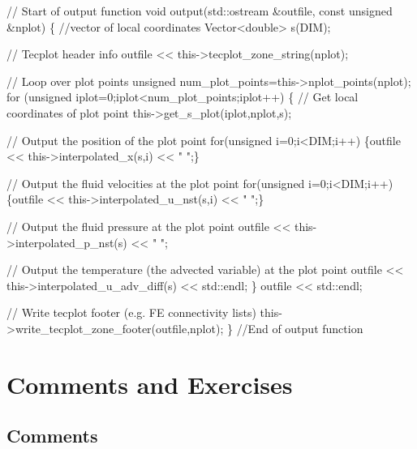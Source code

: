  
\begin{DoxyCodeInclude}
 \textcolor{comment}{// Start of output function}
 \textcolor{keywordtype}{void} output(std::ostream &outfile, \textcolor{keyword}{const} \textcolor{keywordtype}{unsigned} &nplot)
  \{
   \textcolor{comment}{//vector of local coordinates}
   Vector<double> s(DIM);
   
   \textcolor{comment}{// Tecplot header info}
   outfile << this->tecplot\_zone\_string(nplot);
   
   \textcolor{comment}{// Loop over plot points}
   \textcolor{keywordtype}{unsigned} num\_plot\_points=this->nplot\_points(nplot);
   \textcolor{keywordflow}{for} (\textcolor{keywordtype}{unsigned} iplot=0;iplot<num\_plot\_points;iplot++)
    \{
     \textcolor{comment}{// Get local coordinates of plot point}
     this->get\_s\_plot(iplot,nplot,s);
     
     \textcolor{comment}{// Output the position of the plot point}
     \textcolor{keywordflow}{for}(\textcolor{keywordtype}{unsigned} i=0;i<DIM;i++) 
      \{outfile << this->interpolated\_x(s,i) << \textcolor{stringliteral}{" "};\}
     
     \textcolor{comment}{// Output the fluid velocities at the plot point}
     \textcolor{keywordflow}{for}(\textcolor{keywordtype}{unsigned} i=0;i<DIM;i++) 
      \{outfile << this->interpolated\_u\_nst(s,i) << \textcolor{stringliteral}{" "};\}
     
     \textcolor{comment}{// Output the fluid pressure at the plot point}
     outfile << this->interpolated\_p\_nst(s)  << \textcolor{stringliteral}{" "};
  
     \textcolor{comment}{// Output the temperature (the advected variable) at the plot point}
     outfile << this->interpolated\_u\_adv\_diff(s) << std::endl;   
    \}
   outfile << std::endl;
   
   \textcolor{comment}{// Write tecplot footer (e.g. FE connectivity lists)}
   this->write\_tecplot\_zone\_footer(outfile,nplot);
  \} \textcolor{comment}{//End of output function}

\end{DoxyCodeInclude}




 

 \hypertarget{index_comm_and_ex}{}\section{Comments and Exercises}\label{index_comm_and_ex}
\hypertarget{index_comments}{}\subsection{Comments}\label{index_comments}

